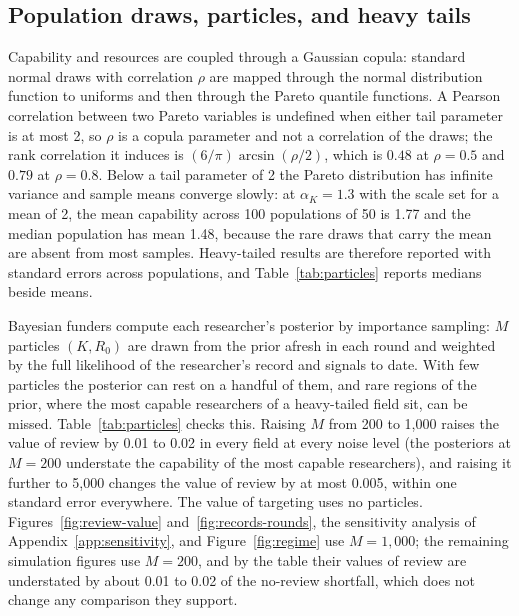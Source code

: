 \subsection*{Population draws, particles, and heavy tails}
Capability and resources are coupled through a Gaussian copula: standard normal draws with correlation $\rho$ are mapped through the normal distribution function to uniforms and then through the Pareto quantile functions. A Pearson correlation between two Pareto variables is undefined when either tail parameter is at most 2, so $\rho$ is a copula parameter and not a correlation of the draws; the rank correlation it induces is $(6/\pi)\arcsin(\rho/2)$, which is $0.48$ at $\rho = 0.5$ and $0.79$ at $\rho = 0.8$. Below a tail parameter of 2 the Pareto distribution has infinite variance and sample means converge slowly: at $\alpha_K = 1.3$ with the scale set for a mean of 2, the mean capability across 100 populations of 50 is 1.77 and the median population has mean 1.48, because the rare draws that carry the mean are absent from most samples. Heavy-tailed results are therefore reported with standard errors across populations, and Table~\ref{tab:particles} reports medians beside means.

Bayesian funders compute each researcher's posterior by importance sampling: $M$ particles $(K, R_0)$ are drawn from the prior afresh in each round and weighted by the full likelihood of the researcher's record and signals to date. With few particles the posterior can rest on a handful of them, and rare regions of the prior, where the most capable researchers of a heavy-tailed field sit, can be missed. Table~\ref{tab:particles} checks this. Raising $M$ from 200 to 1{,}000 raises the value of review by 0.01 to 0.02 in every field at every noise level (the posteriors at $M = 200$ understate the capability of the most capable researchers), and raising it further to 5{,}000 changes the value of review by at most 0.005, within one standard error everywhere. The value of targeting uses no particles. Figures~\ref{fig:review-value} and~\ref{fig:records-rounds}, the sensitivity analysis of Appendix~\ref{app:sensitivity}, and Figure~\ref{fig:regime} use $M = 1{,}000$; the remaining simulation figures use $M = 200$, and by the table their values of review are understated by about 0.01 to 0.02 of the no-review shortfall, which does not change any comparison they support.


